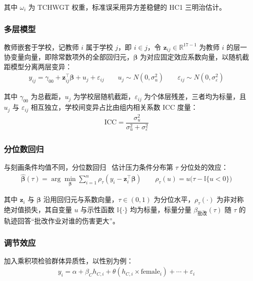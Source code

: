 \documentclass[zihao = -4, linespread = 1.5]{article}
\begin{document}
其中 $\omega_i$ 为 TCHWGT 权重，标准误采用异方差稳健的 HC1 三明治估计。



\subsubsection{多层模型}
教师嵌套于学校，记教师 $i$ 属于学校 $j$，即 $i\in j$，令 $\bm{z}_{ij}\in\mathbb{R}^{17-1}$ 为教师 $i$ 的层一协变量向量，即除常数项外的全部回归元，$\bm{\beta}$ 为对应固定效应系数向量，以随机截距模型分离两层变异：
\begin{align}
    y_{ij}=\gamma_{00}+\bm{z}_{ij}^{\top}\bm{\beta}+u_j+\varepsilon_{ij}\qquad u_j\sim N(0,\sigma_u^2)\qquad\varepsilon_{ij}\sim N(0,\sigma_\varepsilon^2)
\end{align}

其中 $\gamma_{00}$ 为总截距，$u_j$ 为学校层随机截距，$\varepsilon_{ij}$ 为个体层残差，三者均为标量，且 $u_j$ 与 $\varepsilon_{ij}$ 相互独立，学校间变异占比由组内相关系数 ICC 度量：
\begin{align}
    \mathrm{ICC}=\dfrac{\sigma_u^2}{\sigma_u^2+\sigma_\varepsilon^2}
\end{align}



\subsubsection{分位数回归}
与刻画条件均值不同，分位数回归~\citep{Koenker} 估计压力条件分布第 $\tau$ 分位处的效应：
\begin{align}
    \hat{\bm{\beta}}(\tau)=\arg\min_{\bm{\beta}}\sum_{i=1}^{n}\rho_{\tau}\left(y_i - \bm{z}_i^{\top}\bm{\beta}\right)\qquad \rho_{\tau}(u)=u\bigl(\tau-\mathbb{I}\{u<0\}\bigr)
\end{align}

其中 $\bm{z}_i$ 与 $\bm{\beta}$ 沿用回归元与系数向量，$\tau\in(0,1)$ 为分位水平，$\rho_{\tau}(\cdot)$ 为非对称绝对值损失，其自变量 $u$ 与示性函数 $\mathbb{I}\{\cdot\}$ 均为标量，标量分量 $\beta_{\text{批改}}(\tau)$ 随 $\tau$ 的轨迹回答“批改作业对谁的伤害更大”。



\subsubsection{调节效应}
加入乘积项检验群体异质性，以性别为例：
\begin{align}
    y_i=\alpha+\beta_Ch_{C,i}+\theta\left(h_{C,i}\times\mathrm{female}_i\right)+\cdots+\varepsilon_i
\end{align}
\end{document}
